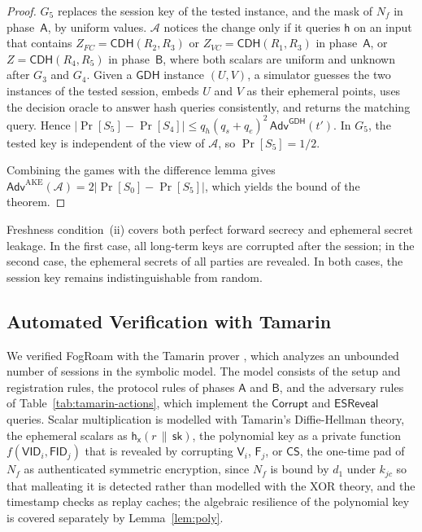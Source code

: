 \documentclass[journal]{IEEEtran}
\theoremstyle{plain}
\theoremstyle{definition}
\newcommand{\Veh}{\mathsf{V}}            %
\newcommand{\Fog}{\mathsf{F}}            %
\newcommand{\CS}{\mathsf{CS}}            %
\newcommand{\Adv}{\mathcal{A}}           %
\newcommand{\VID}{\mathsf{VID}}          %
\newcommand{\FID}{\mathsf{FID}}          %
\newcommand{\h}{\mathsf{h}}              %
\newcommand{\hT}[1]{\h_{\mathsf{#1}}}     %
\newcommand{\sk}{\mathsf{sk}}            %
\newcommand{\Cor}{\mathsf{Corrupt}}
\newcommand{\ESR}{\mathsf{ESReveal}}
\newcommand{\GDH}{\mathsf{GDH}}
\newcommand{\CDH}{\mathsf{CDH}}
\newcommand{\cat}{\,\|\,}               %
\newcommand{\protocol}{\textsf{FogRoam}}   %
\begin{document}
\begin{proof}
\emph{$G_5$} replaces the session key of the tested instance, and the mask of $N_f$ in phase~$\mathsf{A}$, by uniform values. $\Adv$ notices the change only if it queries $\h$ on an input that contains $Z_{FC}=\CDH(R_2,R_3)$ or $Z_{VC}=\CDH(R_1,R_3)$ in phase~$\mathsf{A}$, or $Z=\CDH(R_4,R_5)$ in phase~$\mathsf{B}$, where both scalars are uniform and unknown after $G_3$ and $G_4$. Given a $\GDH$ instance $(U,V)$, a simulator guesses the two instances of the tested session, embeds $U$ and $V$ as their ephemeral points, uses the decision oracle to answer hash queries consistently, and returns the matching query. Hence $|\Pr[S_5]-\Pr[S_4]|\le q_h(q_s+q_e)^2\,\mathsf{Adv}^{\GDH}(t')$. In $G_5$, the tested key is independent of the view of $\Adv$, so $\Pr[S_5]=1/2$.

Combining the games with the difference lemma gives $\mathsf{Adv}^{\mathrm{AKE}}(\Adv)=2|\Pr[S_0]-\Pr[S_5]|$, which yields the bound of the theorem.
\end{proof}

Freshness condition~(ii) covers both perfect forward secrecy and ephemeral secret leakage. In the first case, all long-term keys are corrupted after the session; in the second case, the ephemeral secrets of all parties are revealed. In both cases, the session key remains indistinguishable from random.

\subsection{Automated Verification with Tamarin}\label{sec:tamarin}
We verified {\protocol} with the Tamarin prover \cite{meier2013tamarin}, which analyzes an unbounded number of sessions in the symbolic model. The model consists of the setup and registration rules, the protocol rules of phases $\mathsf{A}$ and $\mathsf{B}$, and the adversary rules of Table~\ref{tab:tamarin-actions}, which implement the $\Cor$ and $\ESR$ queries. Scalar multiplication is modelled with Tamarin's Diffie-Hellman theory, the ephemeral scalars as $\hT{x}(r\cat\sk)$, the polynomial key as a private function $f(\VID_i,\FID_j)$ that is revealed by corrupting $\Veh_i$, $\Fog_j$, or $\CS$, the one-time pad of $N_f$ as authenticated symmetric encryption, since $N_f$ is bound by $d_1$ under $k_{jc}$ so that malleating it is detected rather than modelled with the XOR theory, and the timestamp checks as replay caches; the algebraic resilience of the polynomial key is covered separately by Lemma~\ref{lem:poly}.
\end{document}

